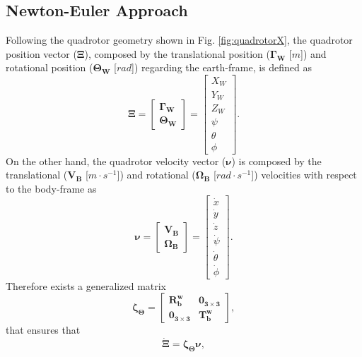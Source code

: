 \subsection{Newton-Euler Approach}
Following the quadrotor geometry shown in Fig. \ref{fig:quadrotorX}, the quadrotor position vector ($\mathbf{\Xi}$), composed by the translational position ($\mathbf{\Gamma_W}$ [$m$]) and rotational position ($\mathbf{\Theta_W}$ [$rad$]) regarding the earth-frame, is defined as
\begin{equation}
\mathbf{\Xi} = \begin{bmatrix}
\mathbf{\Gamma_W} \\ \mathbf{\Theta_W}
\end{bmatrix} = \begin{bmatrix}
X_W \\ Y_W \\ Z_W \\ \psi \\ \theta \\ \phi
\end{bmatrix}.
\end{equation}
On the other hand, the quadrotor velocity vector ($\mathbf{\nu}$) is composed by the translational ($\mathbf{V_B}$ [$m\cdot s^{-1}$]) and rotational ($\mathbf{\Omega_B}$ [$rad\cdot s^{-1}$]) velocities with respect to the body-frame as
\begin{equation}
\mathbf{\nu} = \begin{bmatrix}
\mathbf{V_B} \\ \mathbf{\Omega_B}
\end{bmatrix} =
\begin{bmatrix}
\dot{x} \\ \dot{y} \\ \dot{z} \\ \dot{\psi} \\ \dot{\theta} \\ \dot{\phi}
\end{bmatrix}.
\end{equation}
Therefore exists a generalized matrix
\begin{equation}
\mathbf{\zeta_\Theta} = \begin{bmatrix}
\mathbf{R_{b}^{w}} & \mathbf{0_{3\times 3}} \\
\mathbf{0_{3\times 3}} & \mathbf{T_{b}^{w}}
\end{bmatrix},
\end{equation}
that ensures that
\begin{equation}
\mathbf{\dot{\Xi}} = \mathbf{\zeta_\Theta}\mathbf{\nu},
\end{equation}
